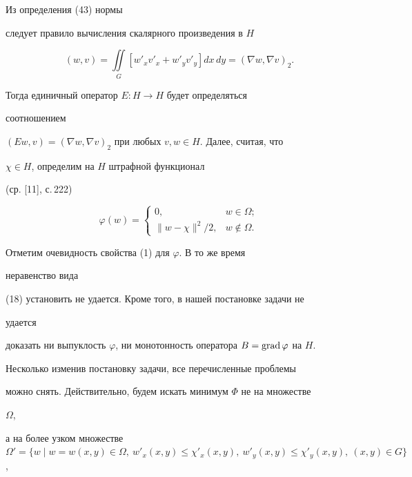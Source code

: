 Из определения (43) нормы


следует правило вычисления скалярного произведения в $H$


\begin{equation}\label {45}


(w,v)=\iint\limits_G [w'_xv'_x+w'_yv'_y ] dx\,dy = (\nabla w,\nabla


v)_2.


\end{equation}


Тогда единичный оператор $E:H \rightarrow H$ будет определяться


соотношением


$(Ew,v)=(\nabla w,\nabla v)_2$ при любых $v,w \in H$. Далее, считая, что


$\chi \in H$, определим на $H$ штрафной функционал


(ср. [11], с.\,222)


\begin{equation}\label {46}


\varphi (w)=


\begin{cases}


0, & w \in \Omega; \\


\|w-\chi \|^2/2, & w \notin \Omega.


\end{cases}


\end{equation}


Отметим очевидность свойства (1) для $\varphi$. В то же время


неравенство вида


(18) установить не удается. Кроме того, в нашей постановке задачи не


удается


доказать ни выпуклость $\varphi $, ни монотонность оператора $B=\grad


\varphi$ на $H$.


Несколько изменив постановку задачи, все перечисленные проблемы


можно снять. Действительно, будем искать минимум $\Phi $ не на множестве


$\Omega$,


а на более узком множестве $\Omega '=\{w\mid w=w(x,y) \in


\Omega,\ w'_x(x,y)


\leq \chi '_x(x,y),\ w'_y(x,y)\leq \chi '_y(x,y),\ (x,y) \in G\}$,


